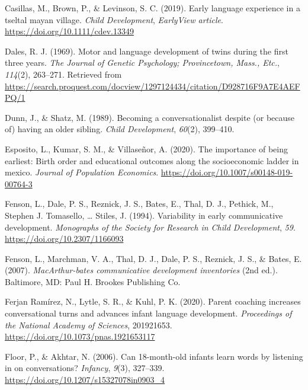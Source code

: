 \documentclass[
  english,
  man,floatsintext]{apa6}
\newlength{\cslhangindent}
\newenvironment{CSLReferences}[2] %
 {%
  \setlength{\parindent}{0pt}
  \ifodd #1 \everypar{\setlength{\hangindent}{\cslhangindent}}\ignorespaces\fi
  \ifnum #2 > 0
  \setlength{\parskip}{#2\baselineskip}
  \fi
 }%
 {}
\begin{document}
\begin{CSLReferences}{1}{0}
\leavevmode{}%
Casillas, M., Brown, P., \& Levinson, S. C. (2019). Early language experience in a tseltal mayan village. \emph{Child Development}, \emph{{EarlyView} article}. \url{https://doi.org/10.1111/cdev.13349}

\leavevmode{}%
Dales, R. J. (1969). Motor and language development of twins during the first three years. \emph{The Journal of Genetic Psychology; Provincetown, Mass., Etc.}, \emph{114}(2), 263--271. Retrieved from \url{https://search.proquest.com/docview/1297124434/citation/D928716F9A7E4AEFPQ/1}

\leavevmode{}%
Dunn, J., \& Shatz, M. (1989). Becoming a conversationalist despite (or because of) having an older sibling. \emph{Child Development}, \emph{60}(2), 399--410.

\leavevmode{}%
Esposito, L., Kumar, S. M., \& Villaseñor, A. (2020). The importance of being earliest: Birth order and educational outcomes along the socioeconomic ladder in mexico. \emph{Journal of Population Economics}. \url{https://doi.org/10.1007/s00148-019-00764-3}

\leavevmode{}%
Fenson, L., Dale, P. S., Reznick, J. S., Bates, E., Thal, D. J., Pethick, M., Stephen J. Tomasello, \ldots{} Stiles, J. (1994). Variability in early communicative development. \emph{Monographs of the Society for Research in Child Development}, \emph{59}. \url{https://doi.org/10.2307/1166093}

\leavevmode{}%
Fenson, L., Marchman, V. A., Thal, D. J., Dale, P. S., Reznick, J. S., \& Bates, E. (2007). \emph{{MacArthur}-bates communicative development inventories} (2nd ed.). Baltimore, {MD}: Paul H. Brookes Publishing Co.

\leavevmode{}%
Ferjan Ramírez, N., Lytle, S. R., \& Kuhl, P. K. (2020). Parent coaching increases conversational turns and advances infant language development. \emph{Proceedings of the National Academy of Sciences}, 201921653. \url{https://doi.org/10.1073/pnas.1921653117}

\leavevmode{}%
Floor, P., \& Akhtar, N. (2006). Can 18-month-old infants learn words by listening in on conversations? \emph{Infancy}, \emph{9}(3), 327--339. \url{https://doi.org/10.1207/s15327078in0903_4}


\end{CSLReferences}
\end{document}
